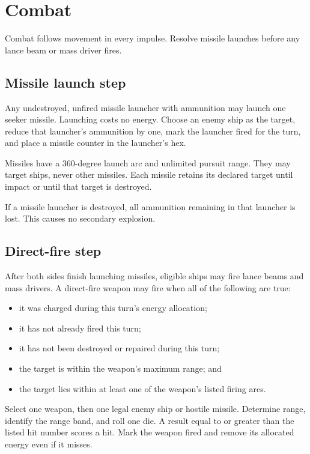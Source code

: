 \chapter{Combat}

Combat follows movement in every impulse. Resolve missile launches before any lance beam or mass driver fires.

\section{Missile launch step}

Any undestroyed, unfired missile launcher with ammunition may launch one seeker missile. Launching costs no energy. Choose an enemy ship as the target, reduce that launcher's ammunition by one, mark the launcher fired for the turn, and place a missile counter in the launcher's hex.

Missiles have a 360-degree launch arc and unlimited pursuit range. They may target ships, never other missiles. Each missile retains its declared target until impact or until that target is destroyed.

If a missile launcher is destroyed, all ammunition remaining in that launcher is lost. This causes no secondary explosion.

\section{Direct-fire step}

After both sides finish launching missiles, eligible ships may fire lance beams and mass drivers. A direct-fire weapon may fire when all of the following are true:

\begin{itemize}
  \item it was charged during this turn's energy allocation;
  \item it has not already fired this turn;
  \item it has not been destroyed or repaired during this turn;
  \item the target is within the weapon's maximum range; and
  \item the target lies within at least one of the weapon's listed firing arcs.
\end{itemize}

Select one weapon, then one legal enemy ship or hostile missile. Determine range, identify the range band, and roll one die. A result equal to or greater than the listed hit number scores a hit. Mark the weapon fired and remove its allocated energy even if it misses.

